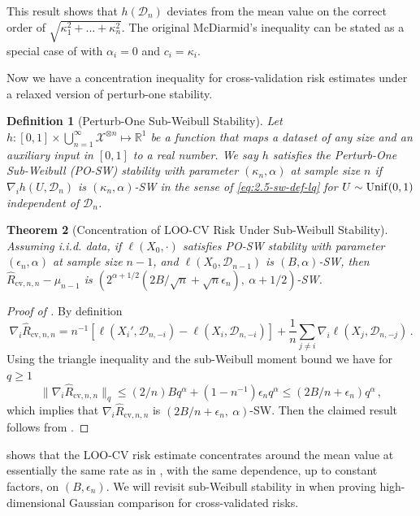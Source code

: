 \documentclass[11pt]{article}
\theoremstyle{plain}
\newtheorem{theorem}{Theorem}[section]
\newtheorem{definition}[theorem]{Definition}
\newcommand{\cv}{{\mathrm{cv}}}
\newcommand{\D}{{\mathcal{D}}}
\newcommand{\X}{{\mathcal{X}}}
\begin{document}
This result shows that $h(\D_n)$ deviates from the mean value on the correct order of $\sqrt{\kappa_1^2+...+\kappa_n^2}$.   The original McDiarmid's inequality can be stated as a special case of  with $\alpha_i=0$ and $c_i=\kappa_i$.

Now we have a concentration inequality for cross-validation risk estimates under a relaxed version of perturb-one stability.
\begin{definition}[Perturb-One Sub-Weibull Stability]\label{def:2.5-po-sw-stab}
       Let $h:[0,1]\times \bigcup_{n=1}^\infty \X^{\otimes n}\mapsto\mathbb R^1$ be a  function that maps a dataset of any size and an auxiliary input in $[0,1]$ to a real number.  
We say $h$ satisfies the Perturb-One Sub-Weibull (PO-SW) stability with parameter $(\kappa_n,\alpha)$ at sample size $n$ if $\nabla_i h(U,\D_n)$ is $(\kappa_n,\alpha)$-SW in the sense of \eqref{eq:2.5-sw-def-lq} for $U\sim {\rm Unif}(0,1)$ independent of $\D_n$.
\end{definition}


\begin{theorem}[Concentration of LOO-CV Risk Under Sub-Weibull Stability]\label{thm:2.5-loocv-concentration-sw}
Assuming i.i.d. data, 
if $\ell(X_0,\cdot)$ satisfies PO-SW stability with parameter $(\epsilon_n,\alpha)$ at sample size $n-1$, and $\ell(X_0,\D_{n-1})$ is $(B,\alpha)$-SW, then  
$\hat R_{\cv,n,n}-\mu_{n-1}$ is $(2^{\alpha+1/2}(2B/\sqrt{n}+\sqrt{n}\epsilon_n),~\alpha+1/2)$-SW.
\end{theorem}
\begin{proof}[Proof of ]
    By definition
    $$\nabla_i \hat R_{\cv,n,n} = n^{-1}\left[\ell(X_i',\D_{n,-i})-\ell(X_i,\D_{n,-i})\right]+\frac{1}{n}\sum_{j\neq i}\nabla_i\ell(X_j,\D_{n,-j})\,.$$
    Using the triangle inequality and the sub-Weibull moment bound we have for $q\ge 1$
    $$\|\nabla_i\hat R_{\cv,n,n}\|_q\le (2/n)B q^\alpha+(1-n^{-1})\epsilon_n q^\alpha\le (2B/n+\epsilon_n)q^\alpha\,,$$
    which implies that $\nabla_i \hat R_{\cv,n,n}$ is $(2B/n+\epsilon_n,~\alpha)$-SW.
    Then the claimed result follows from .
\end{proof}
 shows that the LOO-CV risk estimate concentrates around the mean value at essentially the same rate as in , with the same dependence, up to constant factors, on $(B,\epsilon_n)$. We will revisit sub-Weibull stability in  when proving high-dimensional Gaussian comparison for cross-validated risks.
\end{document}
